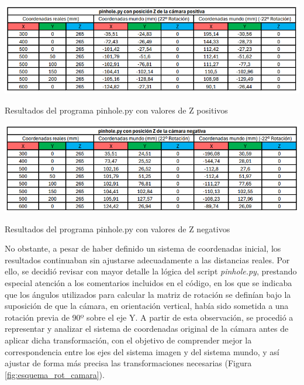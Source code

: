   \begin{table}[H]
    \centering
    \begin{center}
      \includegraphics[width=150mm]{figs/pinhole con Z positiva.png}
    \end{center}
    \caption{Resultados del programa pinhole.py con valores de Z positivos}
    \label{tab:pinhole_Zpos}
  \end{table}
  
  
  \begin{table}[H]
   \centering
   \begin{center}
     \includegraphics[width=150mm]{figs/pinhole con Z negativa.png}
   \end{center}
   \caption{Resultados del programa pinhole.py con valores de Z negativos}
   \label{tab:pinhole_Zneg}
  \end{table}

No obstante, a pesar de haber definido un sistema de coordenadas inicial, los resultados continuaban sin ajustarse adecuadamente a las distancias reales. Por ello, se decidió revisar con mayor detalle la lógica del script \textit{pinhole.py}, prestando especial atención a los comentarios incluidos en el código, en los que se indicaba que los ángulos utilizados para calcular la matriz de rotación se definían bajo la suposición de que la cámara, en orientación vertical, había sido sometida a una rotación previa de 90º sobre el eje Y. A partir de esta observación, se procedió a representar y analizar el sistema de coordenadas original de la cámara antes de aplicar dicha transformación, con el objetivo de comprender mejor la correspondencia entre los ejes del sistema imagen y del sistema mundo, y así ajustar de forma más precisa las transformaciones necesarias (Figura \ref{fig:esquema_rot_camara}). 

